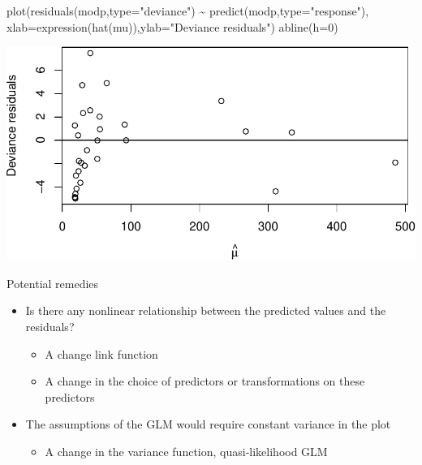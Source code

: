 \documentclass[
  ignorenonframetext,
]{beamer}
\newenvironment{Shaded}{\begin{snugshade}}{\end{snugshade}}
\newcommand{\AttributeTok}[1]{\textcolor[rgb]{0.77,0.63,0.00}{#1}}
\newcommand{\DecValTok}[1]{\textcolor[rgb]{0.00,0.00,0.81}{#1}}
\newcommand{\FunctionTok}[1]{\textcolor[rgb]{0.00,0.00,0.00}{#1}}
\newcommand{\NormalTok}[1]{#1}
\newcommand{\SpecialCharTok}[1]{\textcolor[rgb]{0.00,0.00,0.00}{#1}}
\newcommand{\StringTok}[1]{\textcolor[rgb]{0.31,0.60,0.02}{#1}}
\providecommand{\tightlist}{%
  \setlength{\itemsep}{0pt}\setlength{\parskip}{0pt}}
\begin{document}
\begin{frame}[fragile]{}
\protect\hypertarget{section-2}{}
\scriptsize

\begin{Shaded}
\begin{Highlighting}[]
\FunctionTok{plot}\NormalTok{(}\FunctionTok{residuals}\NormalTok{(modp,}\AttributeTok{type=}\StringTok{"deviance"}\NormalTok{) }\SpecialCharTok{\textasciitilde{}} \FunctionTok{predict}\NormalTok{(modp,}\AttributeTok{type=}\StringTok{"response"}\NormalTok{),}
\AttributeTok{xlab=}\FunctionTok{expression}\NormalTok{(}\FunctionTok{hat}\NormalTok{(mu)),}\AttributeTok{ylab=}\StringTok{"Deviance residuals"}\NormalTok{)}
\FunctionTok{abline}\NormalTok{(}\AttributeTok{h=}\DecValTok{0}\NormalTok{)}
\end{Highlighting}
\end{Shaded}

\includegraphics{week8_p1_files/figure-beamer/unnamed-chunk-3-1.pdf}
\end{frame}

\begin{frame}{Potential remedies}
\protect\hypertarget{potential-remedies}{}
\begin{itemize}
\tightlist
\item
  Is there any nonlinear relationship between the predicted values and
  the residuals?

  \begin{itemize}
  \tightlist
  \item
    A change link function
  \item
    A change in the choice of predictors or transformations on these
    predictors
  \end{itemize}
\item
  The assumptions of the GLM would require constant variance in the plot

  \begin{itemize}
  \tightlist
  \item
    A change in the variance function, quasi-likelihood GLM
  \end{itemize}
\end{itemize}
\end{frame}
\end{document}
